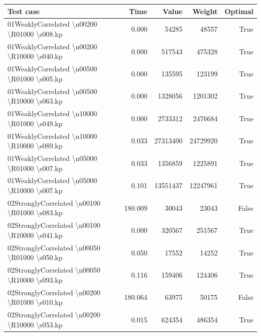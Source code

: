 \documentclass[english, a4paper,12pt]{article}
\begin{document}
\small\begin{tabularx}{0.97\textwidth}{|>{\raggedright\arraybackslash}Xrrrr|}
\hline
\textbf{Test case} & \textbf{Time} & \textbf{Value} & \textbf{Weight} & \textbf{Optimal} \\
\hline
\addlinespace
\hline
01WeaklyCorrelated \textbackslash n00200 \textbackslash R01000 \textbackslash s008.kp & 0.000 & 54285 & 48557 & True \\
01WeaklyCorrelated \textbackslash n00200 \textbackslash R10000 \textbackslash s040.kp & 0.000 & 517543 & 475328 & True \\
01WeaklyCorrelated \textbackslash n00500 \textbackslash R01000 \textbackslash s005.kp & 0.000 & 135595 & 123199 & True \\
01WeaklyCorrelated \textbackslash n00500 \textbackslash R10000 \textbackslash s063.kp & 0.000 & 1328056 & 1201302 & True \\
01WeaklyCorrelated \textbackslash n10000 \textbackslash R01000 \textbackslash s049.kp & 0.000 & 2733312 & 2476684 & True \\
01WeaklyCorrelated \textbackslash n10000 \textbackslash R10000 \textbackslash s089.kp & 0.033 & 27313400 & 24729920 & True \\
01WeaklyCorrelated \textbackslash n05000 \textbackslash R01000 \textbackslash s007.kp & 0.033 & 1356859 & 1225891 & True \\
01WeaklyCorrelated \textbackslash n05000 \textbackslash R10000 \textbackslash s007.kp & 0.101 & 13551437 & 12247961 & True \\
\hline
\addlinespace
\hline
02StronglyCorrelated \textbackslash n00100 \textbackslash R01000 \textbackslash s083.kp & 180.009 & 30043 & 23043 & False \\
02StronglyCorrelated \textbackslash n00100 \textbackslash R10000 \textbackslash s041.kp & 0.000 & 320567 & 251567 & True \\
02StronglyCorrelated \textbackslash n00050 \textbackslash R01000 \textbackslash s050.kp & 0.050 & 17552 & 14252 & True \\
02StronglyCorrelated \textbackslash n00050 \textbackslash R10000 \textbackslash s093.kp & 0.116 & 159406 & 124406 & True \\
02StronglyCorrelated \textbackslash n00200 \textbackslash R01000 \textbackslash s010.kp & 180.064 & 63975 & 50175 & False \\
02StronglyCorrelated \textbackslash n00200 \textbackslash R10000 \textbackslash s053.kp & 0.015 & 624354 & 486354 & True \\

\end{tabularx}
\end{document}
